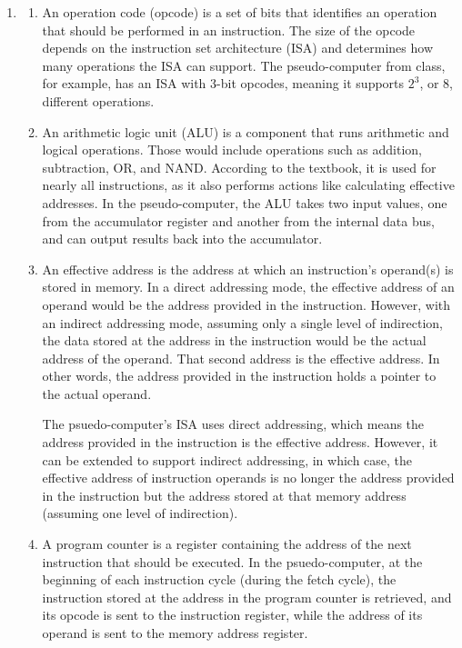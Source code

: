 \documentclass[11pt]{article}
\begin{document}
\begin{enumerate}[leftmargin=0.2in]

\item
\begin{enumerate}
  \item An operation code (opcode) is a set of bits that identifies an operation that should be performed in an instruction. The size of the opcode depends on the instruction set architecture (ISA) and determines how many operations the ISA can support. The pseudo-computer from class, for example, has an ISA with 3-bit opcodes, meaning it supports $2^3$, or 8, different operations.

  \item An arithmetic logic unit (ALU) is a component that runs arithmetic and logical operations. Those would include operations such as addition, subtraction, OR, and NAND. According to the textbook, it is used for nearly all instructions, as it also performs actions like calculating effective addresses. In the pseudo-computer, the ALU takes two input values, one from the accumulator register and another from the internal data bus, and can output results back into the accumulator.

  \item An effective address is the address at which an instruction's operand(s) is stored in memory. In a direct addressing mode, the effective address of an operand would be the address provided in the instruction. However, with an indirect addressing mode, assuming only a single level of indirection, the data stored at the address in the instruction would be the actual address of the operand. That second address is the effective address. In other words, the address provided in the instruction holds a pointer to the actual operand.

  The psuedo-computer's ISA uses direct addressing, which means the address provided in the instruction is the effective address. However, it can be extended to support indirect addressing, in which case, the effective address of instruction operands is no longer the address provided in the instruction but the address stored at that memory address (assuming one level of indirection).

  \item A program counter is a register containing the address of the next instruction that should be executed. In the psuedo-computer, at the beginning of each instruction cycle (during the fetch cycle), the instruction stored at the address in the program counter is retrieved, and its opcode is sent to the instruction register, while the address of its operand is sent to the memory address register.


\end{enumerate}
\end{enumerate}
\end{document}
